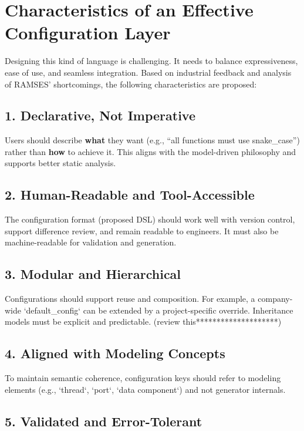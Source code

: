 \section{Characteristics of an Effective Configuration Layer}
\label{sec:config_language_characteristics}

Designing this kind of language is challenging. It needs to balance expressiveness, ease of use, and seamless integration. Based on industrial feedback and analysis of RAMSES’ shortcomings, the following characteristics are proposed:

\subsection*{1. Declarative, Not Imperative}

Users should describe \textbf{what} they want (e.g., “all functions must use snake\_case”) rather than \textbf{how} to achieve it. This aligns with the model-driven philosophy and supports better static analysis.

\subsection*{2. Human-Readable and Tool-Accessible}

The configuration format (proposed DSL) should work well with version control, support difference review, and remain readable to engineers. It must also be machine-readable for validation and generation.

\subsection*{3. Modular and Hierarchical}

Configurations should support reuse and composition. For example, a company-wide `default\_config` can be extended by a project-specific override. Inheritance models must be explicit and predictable. (review this********************)

\subsection*{4. Aligned with Modeling Concepts}

To maintain semantic coherence, configuration keys should refer to modeling elements (e.g., `thread`, `port`, `data component`) and not generator internals.

\subsection*{5. Validated and Error-Tolerant}

